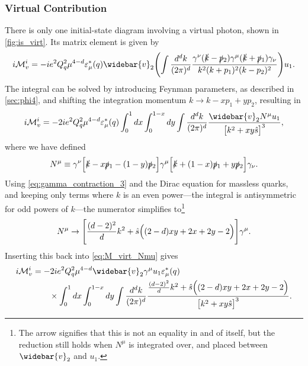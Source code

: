 \subsubsection{Virtual Contribution}
There is only one initial-state diagram involving a virtual photon, shown in \cref{fig:is_virt}. Its matrix element is given by
\begin{equation}
    i\M^i_v = -ie^2Q_q^2 \mu^{4-d} \eps^*_\mu(q) \widebar{v}_2
    \Biggl(
        \int\frac{d^dk}{(2\pi)^d} \frac{\gamma^\nu (\kslash-\ptwoslash)\gamma^\mu(\kslash+\poneslash)\gamma_\nu}{k^2(k+p_1)^2(k-p_2)^2}
    \Biggr) u_1.
\end{equation}
The integral can be solved by introducing Feynman parameters, as described in \cref{sec:phi4}, and shifting the integration momentum $k \to k-xp_1+yp_2$, resulting in
\begin{equation}
    i\M^i_v = -2ie^2Q_q^2\mu^{4-d} \eps^*_\mu(q) \int_0^1 dx \int_0^{1-x}dy \int\frac{d^dk}{(2\pi)^d} \frac{\widebar{v}_2 N^\mu u_1}{\bigl[ k^2+xy\shat \bigr]^3},
    \label{eq:M_virt_Nmu}
\end{equation}
where we have defined
\begin{equation}
    N^\mu \equiv \gamma^\nu \Bigl[ \slashed{k} - x\slashed{p}{}_1 - (1-y)\slashed{p}{}_2 \Bigr] \gamma^\mu \Bigl[ \slashed{k} + (1-x)\slashed{p}{}_1 + y\slashed{p}{}_2 \Bigr] \gamma_\nu.
\end{equation}
Using \cref{eq:gamma_contraction_3} and the Dirac equation for massless quarks, and keeping only terms where $k$ is an even power---the integral is antisymmetric for odd powers of $k$---the numerator simplifies to\footnote{The arrow signifies that this is not an equality in and of itself, but the reduction still holds when $N^\mu$ is integrated over, and placed between $\widebar{v}_2$ and $u_1$.}
\begin{equation}
    N^\mu \to \Biggl[ \frac{(d-2)^2}{d} k^2 + \hat{s} \Bigl((2-d)xy + 2x + 2y - 2 \Bigr) \Biggr] \gamma^\mu.
\end{equation}
Inserting this back into \cref{eq:M_virt_Nmu} gives
\begin{equation}
\begin{split}
    i\M^i_v &= -2ie^2Q_q^2\mu^{4-d} \widebar{v}_2 \gamma^\mu u_1 \eps^*_\mu(q)
    \\ &\qquad \times
    \int_0^1 dx \int_0^{1-x}dy \int\frac{d^dk}{(2\pi)^d} \frac{\frac{(d-2)^2}{d} k^2 + \shat \Bigl((2-d)xy + 2x + 2y - 2 \Bigr)}{\bigl[ k^2+xy\shat \bigr]^3}.
    \label{eq:M_virt_k}
\end{split}
\end{equation}
